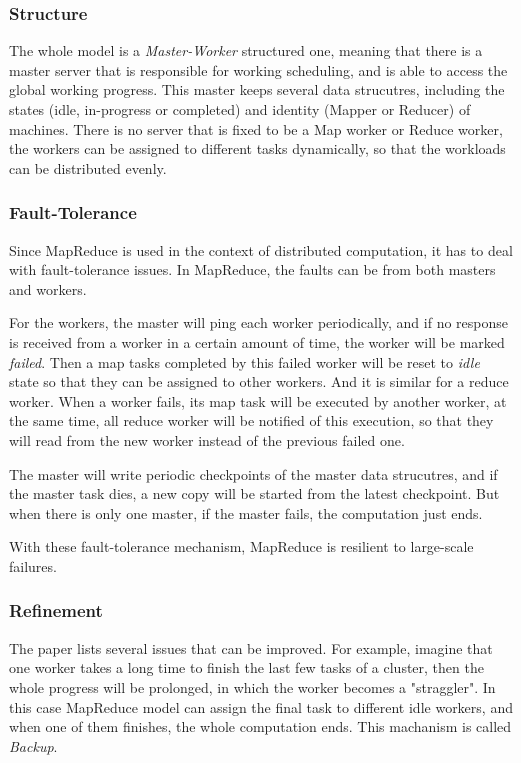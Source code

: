 \documentclass[]{report}
\begin{document}
		\subsubsection*{Structure}
			The whole model is a \textit{Master-Worker} structured one, meaning that there is a master server that is responsible for working scheduling, and is able to access the global working progress. This master keeps several data strucutres, including the states (idle, in-progress or completed) and identity (Mapper or Reducer) of machines. There is no server that is fixed to be a Map worker or Reduce worker, the workers can be assigned to different tasks dynamically, so that the workloads can be distributed evenly.
		
		\subsubsection{Fault-Tolerance}
			Since MapReduce is used in the context of distributed computation, it has to deal with fault-tolerance issues. In MapReduce, the faults can be from both masters and workers. 
			
			For the workers, the master will ping each worker periodically, and if no response is received from a worker in a certain amount of time, the worker will be marked \textit{failed}. Then a map tasks completed by this failed worker will be reset to \textit{idle} state so that they can be assigned to other workers. And it is similar for a reduce worker. When a worker fails, its map task will be executed by another worker, at the same time, all reduce worker will be notified of this execution, so that they will read from the new worker instead of the previous failed one.
			
			The master will write periodic checkpoints of the master data strucutres, and if the master task dies, a new copy will be started from the latest checkpoint. But when there is only one master, if the master fails, the computation just ends.
			
			With these fault-tolerance mechanism, MapReduce is resilient to large-scale failures.
		
		\subsubsection{Refinement}
			The paper lists several issues that can be improved. For example, imagine that one worker takes a long time to finish the last few tasks of a cluster, then the whole progress will be prolonged, in which the worker becomes a "straggler". In this case MapReduce model can assign the final task to different idle workers, and when one of them finishes, the whole computation ends. This machanism is called \textit{Backup}.
	
\end{document}
